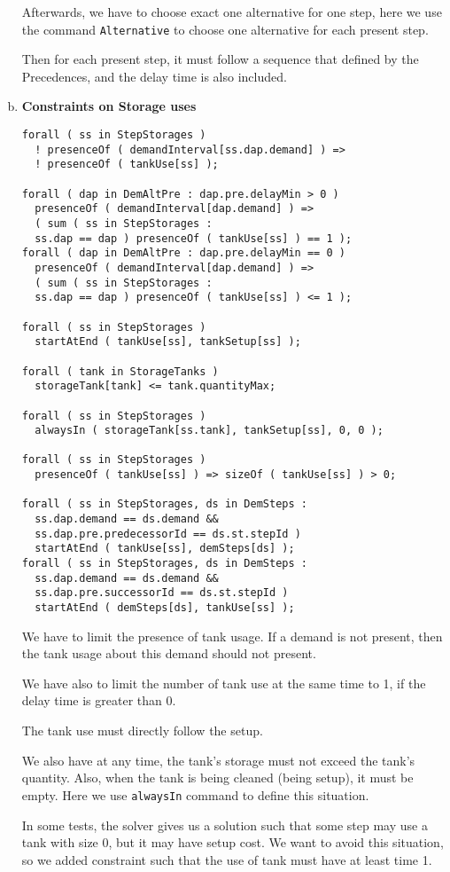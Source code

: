 \documentclass[a4paper, 12pt]{article}
\begin{document}
\begin{enumerate}[a.~]
Afterwards, we have to choose exact one alternative for one step, here we use the command \texttt{Alternative} to choose one alternative for each present step. 

Then for each present step, it must follow a sequence that defined by the Precedences, and the delay time is also included. 
\item \textbf{Constraints on Storage uses}
\begin{lstlisting}
forall ( ss in StepStorages )
  ! presenceOf ( demandInterval[ss.dap.demand] ) => 
  ! presenceOf ( tankUse[ss] );

forall ( dap in DemAltPre : dap.pre.delayMin > 0 )
  presenceOf ( demandInterval[dap.demand] ) => 
  ( sum ( ss in StepStorages :
  ss.dap == dap ) presenceOf ( tankUse[ss] ) == 1 );
forall ( dap in DemAltPre : dap.pre.delayMin == 0 )
  presenceOf ( demandInterval[dap.demand] ) => 
  ( sum ( ss in StepStorages :
  ss.dap == dap ) presenceOf ( tankUse[ss] ) <= 1 );

forall ( ss in StepStorages )
  startAtEnd ( tankUse[ss], tankSetup[ss] );

forall ( tank in StorageTanks )
  storageTank[tank] <= tank.quantityMax;

forall ( ss in StepStorages )
  alwaysIn ( storageTank[ss.tank], tankSetup[ss], 0, 0 );

forall ( ss in StepStorages )
  presenceOf ( tankUse[ss] ) => sizeOf ( tankUse[ss] ) > 0;

forall ( ss in StepStorages, ds in DemSteps :
  ss.dap.demand == ds.demand && 
  ss.dap.pre.predecessorId == ds.st.stepId )
  startAtEnd ( tankUse[ss], demSteps[ds] );
forall ( ss in StepStorages, ds in DemSteps :
  ss.dap.demand == ds.demand && 
  ss.dap.pre.successorId == ds.st.stepId )
  startAtEnd ( demSteps[ds], tankUse[ss] );
\end{lstlisting}
We have to limit the presence of tank usage. If a demand is not present, then the tank usage about this demand should not present. 

We have also to limit the number of tank use at the same time to 1, if the delay time is greater than 0. 

The tank use must directly follow the setup. 

We also have at any time, the tank's storage must not exceed the tank's quantity. Also, when the tank is being cleaned (being setup), it must be empty. Here we use \texttt{alwaysIn} command to define this situation. 

In some tests, the solver gives us a solution such that some step may use a tank with size 0, but it may have setup cost. We want to avoid this situation, so we added constraint such that the use of tank must have at least time 1. 


\end{enumerate}
\end{document}
